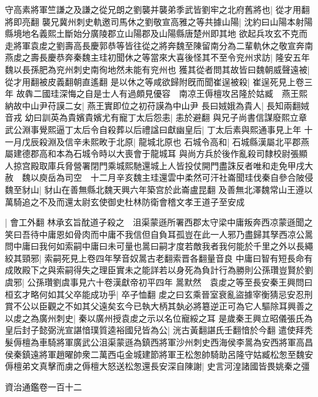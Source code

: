 守高素將軍竺謙之及謙之從兄朗之劉襲并襲弟季武皆劉牢之北府舊將也|{
	從才用翻將即亮翻}
襲兄冀州刺史軌邀司馬休之劉敬宣高雅之等共據山陽|{
	沈約曰山陽本射陽縣境地名義熙土斷始分廣陵郡立山陽郡及山陽縣唐楚州即其地}
欲起兵攻玄不克而走將軍袁䖍之劉壽高長慶郭恭等皆往從之將奔魏至陳留南分為二輩軌休之敬宣奔南燕䖍之壽長慶恭奔秦魏主珪初聞休之等當來大喜後怪其不至令兖州求訪|{
	隆安五年魏以長孫肥為兖州刺史南徇地然未能有兖州也}
獲其從者問其故皆曰魏朝威聲遠被|{
	從才用翻被皮義翻朝直遙翻}
是以休之等咸欲歸附旣而聞崔逞被殺|{
	崔逞死見上卷三年}
故犇二國珪深悔之自是士人有過頗見優容　南凉王傉檀攻呂隆於姑臧　燕王熙納故中山尹苻謨二女|{
	燕王實即位之初苻謨為中山尹}
長曰娀娥為貴人|{
	長知兩翻娀音戎}
幼曰訓英為貴嬪貴嬪尤有寵丁太后怨恚|{
	恚於避翻}
與兄子尚書信謀廢熙立章武公淵事覺熙逼丁太后令自殺葬以后禮諡曰獻幽皇后|{
	丁太后素與熙通事見上年}
十一月戊辰殺淵及信辛未熙畋于北原|{
	龍城北原也}
石城令高和|{
	石城縣漢屬北平郡燕屬建德郡高和本為石城令時以大喪會于龍城耳}
與尚方兵於後作亂殺司隸校尉張顯人掠宫殿取庫兵脅營署閉門乘城熙馳還城上人皆投仗開門盡誅反者唯和走免甲戌大赦　魏以庾岳為司空　十二月辛亥魏主珪還雲中柔然可汗社崙聞珪伐秦自參合陂侵魏至豺山|{
	豺山在善無縣北魏天興六年築宫於此崙盧昆翻}
及善無北澤魏常山王遵以萬騎追之不及而還太尉玄使御史杜林防衛會稽文孝王道子至安成

|{
	會工外翻}
林承玄旨酖道子殺之　沮渠蒙遜所署西郡太守梁中庸叛奔西凉蒙遜聞之笑曰吾待中庸恩如骨肉而中庸不我信但自負耳孤豈在此一人邪乃盡歸其孥西凉公暠問中庸曰我何如索嗣中庸曰未可量也暠曰嗣才度若敵我者我何能於千里之外以長繩絞其頸邪|{
	索嗣死見上卷四年孥音奴暠古老翻索晋各翻量音良}
中庸曰智有短長命有成敗殿下之與索嗣得失之理臣實未之能詳若以身死為負計行為勝則公孫瓚豈賢於劉虞邪|{
	公孫瓚劉虞事見六十卷漢獻帝初平四年}
暠默然　袁䖍之等至長安秦王興問曰桓玄才略何如其父卒能成功乎|{
	卒子恤翻}
䖍之曰玄乘晉室衰亂盜據宰衡猜忌安忍刑賞不公以臣觀之不如其父遠矣玄今已執大柄其埶必將簒逆正可為它人驅除耳興善之以䖍之為廣州刺史|{
	秦以廣州授袁䖍之示以名位寵綏之耳}
是歲秦王興立昭儀張氏為皇后封子懿弼洸宣諶愔璞質逵裕國兒皆為公|{
	洸古黃翻諶氏壬翻愔於今翻}
遣使拜秃髮傉檀為車騎將軍廣武公沮渠蒙遜為鎮西將軍沙州刺史西海侯李暠為安西將軍高昌侯秦鎮遠將軍趙曜帥衆二萬西屯金城建節將軍王松怱帥騎助呂隆守姑臧松怱至魏安傉檀弟文真擊而虜之傉檀大怒送松怱還長安深自陳謝|{
	史言河湟諸國皆畏姚秦之彊}


資治通鑑卷一百十二
